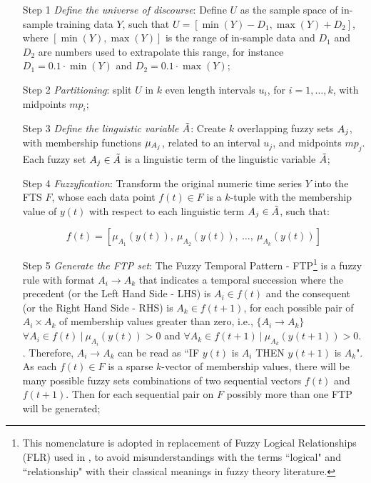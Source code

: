 \begin{enumerate}
\item[Step 1] \textit{Define the universe of discourse}: Define $U$ as the sample space of in-sample training data $Y$, such that $U = [\min(Y) - D_1, \max(Y)+D_2]$, where $[\min(Y), \max(Y)]$ is the range of in-sample data and $D_1$ and $D_2$ are numbers used to extrapolate this range, for instance $D_1 = 0.1\cdot\min(Y)$ and $D_2 = 0.1\cdot\max(Y)$;

\item[Step 2] \textit{Partitioning}: split $U$ in $k$ even length intervals $u_i$, for $i = 1,\ldots,k$, with midpoints $mp_i$;

\item[Step 3] \textit{Define the linguistic variable $\tilde{A}$}: Create $k$ overlapping fuzzy sets $A_j$, with membership functions $\mu_{A_j}$, related to an interval $u_j$, and midpoints $mp_j$. Each fuzzy set $A_j \in \tilde{A}$ is a linguistic term of the linguistic variable $\tilde{A}$;

\item[Step 4] \textit{Fuzzyfication}: Transform the original numeric time series $Y$ into the FTS $F$, whose each data point $f(t) \in F$ is a $k$-tuple with the membership value of $y(t)$ with respect to each linguistic term $A_j \in \tilde{A}$, such that:

\begin{equation}
f(t) = \left[\mu_{A_1}(y(t)),\ \mu_{A_2}(y(t)),\ \ldots,\ \mu_{A_k}(y(t)) \right]
\end{equation}

\item[Step 5] \textit{Generate the FTP set}: The Fuzzy Temporal Pattern - FTP\footnote{This nomenclature is adopted in replacement of Fuzzy Logical Relationships (FLR) used in \cite{song1993fuzzy}, to avoid misunderstandings with the terms ``logical" and ``relationship" with their classical meanings in fuzzy theory literature.} is a fuzzy rule with format $A_i \rightarrow A_k$ that indicates a temporal succession where the precedent (or the Left Hand Side - LHS) is $A_i \in f(t)$ and the consequent (or the Right Hand Side - RHS) is $A_k \in f(t+1)$, for each possible pair of $A_i \times A_k$ of membership values greater than zero, i.e.,  $\{A_i \rightarrow A_k\}$ $\forall A_i \in f(t)\ |\ \mu_{A_i}(y(t)) > 0$ and $\forall A_k \in f(t+1)\ |\ \mu_{A_k}(y(t+1)) > 0 $. . Therefore, $A_i \rightarrow A_k$ can be read as ``IF $y(t)$ is $A_i$ THEN $y(t+1)$ is $A_k$".
As each $f(t) \in F$ is a sparse $k$-vector of membership values, there will be many possible fuzzy sets combinations of two sequential vectors $f(t)$ and $f(t+1)$. Then for each sequential pair on $F$ possibly more than one FTP will be generated;


\end{enumerate}
